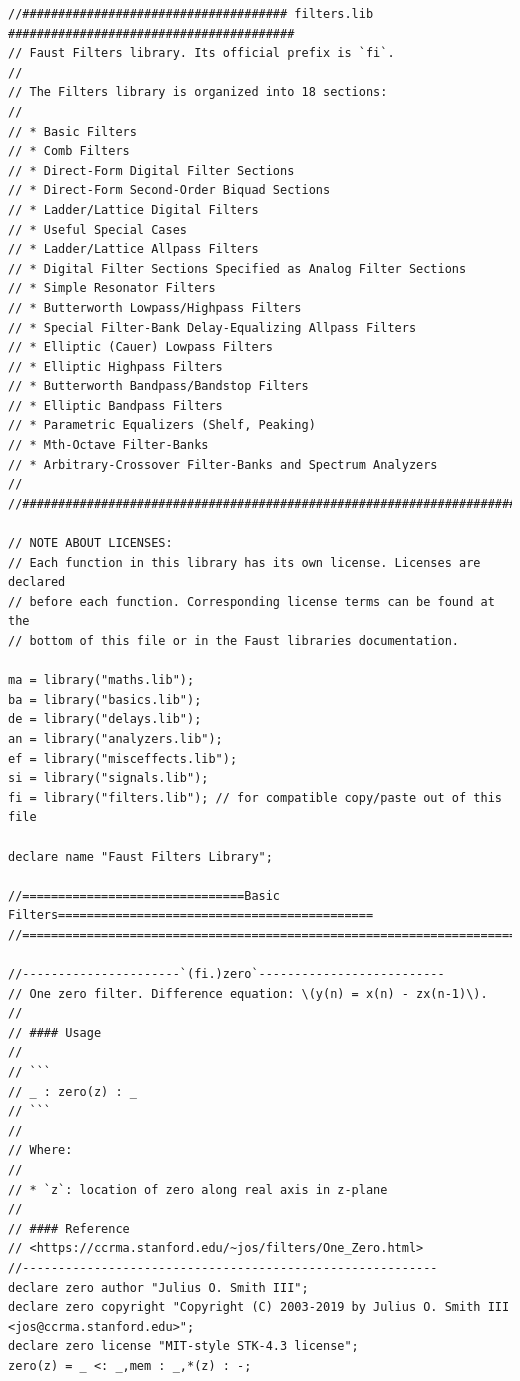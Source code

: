 \documentclass{article}
\begin{document}
\bigskip\bigskip
\begin{lstlisting}[caption=\texttt{filters.lib}]
//##################################### filters.lib ########################################
// Faust Filters library. Its official prefix is `fi`.
//
// The Filters library is organized into 18 sections:
//
// * Basic Filters
// * Comb Filters
// * Direct-Form Digital Filter Sections
// * Direct-Form Second-Order Biquad Sections
// * Ladder/Lattice Digital Filters
// * Useful Special Cases
// * Ladder/Lattice Allpass Filters
// * Digital Filter Sections Specified as Analog Filter Sections
// * Simple Resonator Filters
// * Butterworth Lowpass/Highpass Filters
// * Special Filter-Bank Delay-Equalizing Allpass Filters
// * Elliptic (Cauer) Lowpass Filters
// * Elliptic Highpass Filters
// * Butterworth Bandpass/Bandstop Filters
// * Elliptic Bandpass Filters
// * Parametric Equalizers (Shelf, Peaking)
// * Mth-Octave Filter-Banks
// * Arbitrary-Crossover Filter-Banks and Spectrum Analyzers
//
//########################################################################################

// NOTE ABOUT LICENSES:
// Each function in this library has its own license. Licenses are declared
// before each function. Corresponding license terms can be found at the 
// bottom of this file or in the Faust libraries documentation.

ma = library("maths.lib");
ba = library("basics.lib");
de = library("delays.lib");
an = library("analyzers.lib");
ef = library("misceffects.lib");
si = library("signals.lib");
fi = library("filters.lib"); // for compatible copy/paste out of this file

declare name "Faust Filters Library";

//===============================Basic Filters============================================
//========================================================================================

//----------------------`(fi.)zero`--------------------------
// One zero filter. Difference equation: \(y(n) = x(n) - zx(n-1)\).
//
// #### Usage
//
// ```
// _ : zero(z) : _
// ```
//
// Where:
//
// * `z`: location of zero along real axis in z-plane
//
// #### Reference
// <https://ccrma.stanford.edu/~jos/filters/One_Zero.html>
//----------------------------------------------------------
declare zero author "Julius O. Smith III";
declare zero copyright "Copyright (C) 2003-2019 by Julius O. Smith III <jos@ccrma.stanford.edu>";
declare zero license "MIT-style STK-4.3 license";
zero(z) = _ <: _,mem : _,*(z) : -;


\end{lstlisting}
\end{document}
